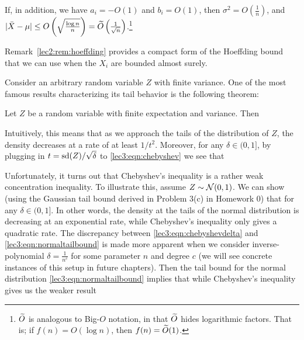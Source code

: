 \begin{remark}\label{lec2:rem:hoeffding}
    If, in addition, we have $a_i = -O(1)$ and $b_i = O(1)$, then $\sigma^2 = O \left( \frac{1}{n}\right)$, and $|\bar{X} - \mu | \leq O\left(\sqrt{\frac{\log n}{n}}\right) = \widetilde{O}\left(\frac{1}{\sqrt{n}}\right)$.\footnote{$\widetilde{O}$ is analogous to Big-$O$ notation, in that $\widetilde{O}$ hides logarithmic factors. That is; if $f(n) = O(\log n)$, then $f(n) = \widetilde{O}(1)$.}
\end{remark}

Remark~\ref{lec2:rem:hoeffding} provides a compact form of the Hoeffding bound that we can use when the $X_i$ are bounded almost surely.



Consider an arbitrary random variable $Z$ with finite variance. One of the most famous results characterizing its tail behavior is the following theorem:

\begin{theorem}
    Let $Z$ be a random variable with finite expectation and variance. Then
\end{theorem}

Intuitively, this means that as we approach the tails of the distribution of $Z$, the density decreases at a rate of at least $1 / t^2$. Moreover, for any $\delta \in (0, 1]$, by plugging in $t = \operatorname{sd}(Z) / \sqrt{\delta}$ to \eqref{lec3:eqn:chebyshev} we see that 
    
Unfortunately, it turns out that Chebyshev's inequality is a rather weak concentration inequality. To illustrate this, assume $Z \sim \mathcal N(0, 1)$. We can show (using the Gaussian tail bound derived in Problem 3(c) in Homework 0) that
for any $\delta \in (0, 1]$. In other words, the density at the tails of the normal distribution is decreasing at an exponential rate, while Chebyshev's inequality only gives a quadratic rate. The discrepancy between \eqref{lec3:eqn:chebyshevdelta} and \eqref{lec3:eqn:normaltailbound} is made more apparent when we consider inverse-polynomial $\delta = \frac{1}{n^c}$ for some parameter $n$ and degree $c$ (we will see concrete instances of this setup in future chapters). Then the tail bound for the normal distribution \eqref{lec3:eqn:normaltailbound} implies that
while Chebyshev's inequality gives us the weaker result

